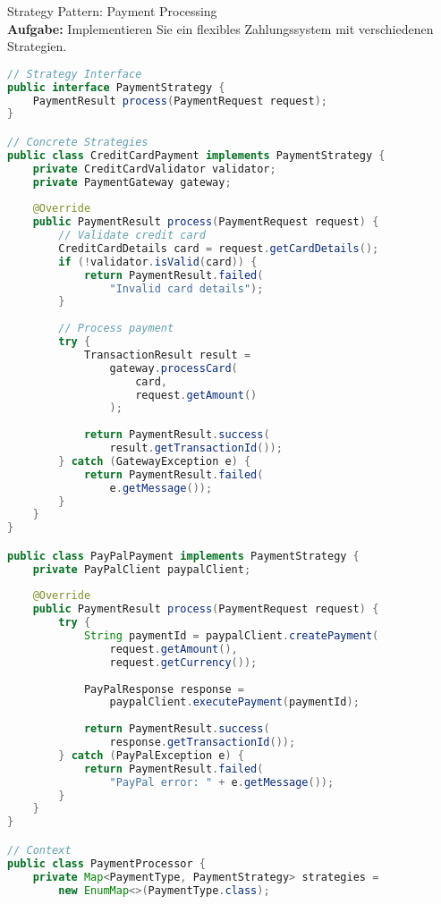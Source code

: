 \begin{example2}[breakable]{Strategy Pattern: Payment Processing}\\
\textbf{Aufgabe:} Implementieren Sie ein flexibles Zahlungssystem mit verschiedenen Strategien.

\begin{lstlisting}[language=Java, style=basesmol]
// Strategy Interface
public interface PaymentStrategy {
    PaymentResult process(PaymentRequest request);
}

// Concrete Strategies
public class CreditCardPayment implements PaymentStrategy {
    private CreditCardValidator validator;
    private PaymentGateway gateway;
    
    @Override
    public PaymentResult process(PaymentRequest request) {
        // Validate credit card
        CreditCardDetails card = request.getCardDetails();
        if (!validator.isValid(card)) {
            return PaymentResult.failed(
                "Invalid card details");
        }
        
        // Process payment
        try {
            TransactionResult result = 
                gateway.processCard(
                    card,
                    request.getAmount()
                );
            
            return PaymentResult.success(
                result.getTransactionId());
        } catch (GatewayException e) {
            return PaymentResult.failed(
                e.getMessage());
        }
    }
}

public class PayPalPayment implements PaymentStrategy {
    private PayPalClient paypalClient;
    
    @Override
    public PaymentResult process(PaymentRequest request) {
        try {
            String paymentId = paypalClient.createPayment(
                request.getAmount(),
                request.getCurrency());
                
            PayPalResponse response = 
                paypalClient.executePayment(paymentId);
                
            return PaymentResult.success(
                response.getTransactionId());
        } catch (PayPalException e) {
            return PaymentResult.failed(
                "PayPal error: " + e.getMessage());
        }
    }
}

// Context
public class PaymentProcessor {
    private Map<PaymentType, PaymentStrategy> strategies = 
        new EnumMap<>(PaymentType.class);
        

\end{lstlisting}
\end{example2}
